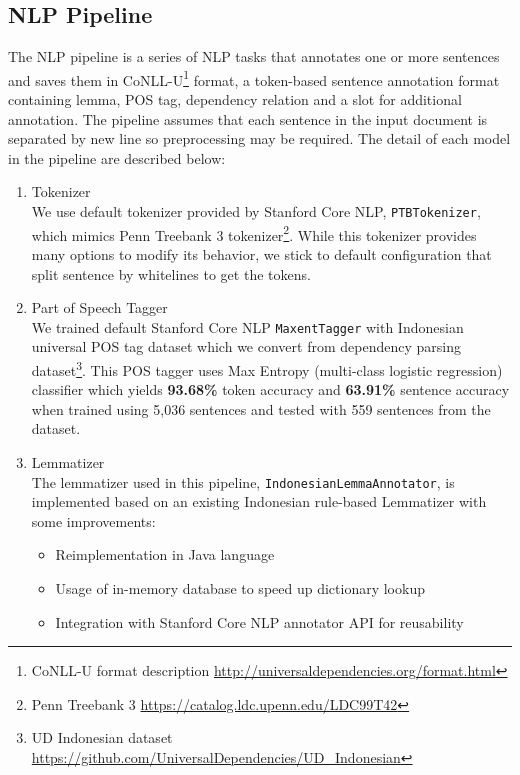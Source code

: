 \documentclass[conference,compsoc,12pt]{IEEEtran}
\begin{document}
\subsection{NLP Pipeline}

The NLP pipeline is a series of NLP tasks that annotates one or more sentences and saves them in CoNLL-U\footnote{CoNLL-U format description \url{http://universaldependencies.org/format.html}} format, a token-based sentence annotation format containing lemma, POS tag, dependency relation and a slot for additional annotation. The pipeline assumes that each sentence in the input document is separated by new line so preprocessing may be required. The detail of each model in the pipeline are described below:

\begin{enumerate}

\item Tokenizer \\
We use default tokenizer provided by Stanford Core NLP, \verb|PTBTokenizer|\cite{manningptbtokenizer}, which mimics Penn Treebank 3 tokenizer\footnote{Penn Treebank 3 \url{https://catalog.ldc.upenn.edu/LDC99T42}}. While this tokenizer provides many options to modify its behavior, we stick to default configuration that split sentence by whitelines to get the tokens.\\

\item Part of Speech Tagger \\
We trained default Stanford Core NLP \verb|MaxentTagger|\cite{toutanova2003feature} with Indonesian universal POS tag dataset which we convert from dependency parsing dataset\footnote{UD Indonesian dataset \url{https://github.com/UniversalDependencies/UD_Indonesian}}. This POS tagger uses Max Entropy (multi-class logistic regression) classifier which yields \textbf{93.68\%} token accuracy and \textbf{63.91\%} sentence accuracy when trained using 5,036 sentences and tested with 559 sentences from the dataset. \\

\item Lemmatizer \\
The lemmatizer used in this pipeline, \verb|IndonesianLemmaAnnotator|, is implemented based on an existing Indonesian rule-based Lemmatizer\cite{suhartono2014lemmatization} with some improvements:

\begin{itemize}
\item Reimplementation in Java language
\item Usage of in-memory database to speed up dictionary lookup
\item Integration with Stanford Core NLP annotator API for reusability
\end{itemize}


\end{enumerate}
\end{document}

